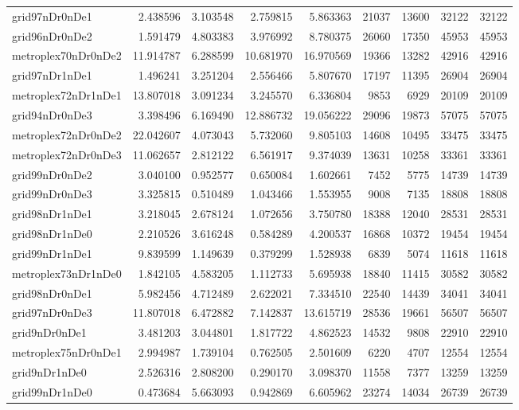 \begin{longtable}{|l|r|r|r|r|r|r|r|r|}
grid97nDr0nDe1 & 2.438596 & 3.103548 & 2.759815 & 5.863363 & 21037 & 13600 & 32122 & 32122 \\
grid96nDr0nDe2 & 1.591479 & 4.803383 & 3.976992 & 8.780375 & 26060 & 17350 & 45953 & 45953 \\
metroplex70nDr0nDe2 & 11.914787 & 6.288599 & 10.681970 & 16.970569 & 19366 & 13282 & 42916 & 42916 \\
grid97nDr1nDe1 & 1.496241 & 3.251204 & 2.556466 & 5.807670 & 17197 & 11395 & 26904 & 26904 \\
metroplex72nDr1nDe1 & 13.807018 & 3.091234 & 3.245570 & 6.336804 & 9853 & 6929 & 20109 & 20109 \\
grid94nDr0nDe3 & 3.398496 & 6.169490 & 12.886732 & 19.056222 & 29096 & 19873 & 57075 & 57075 \\
metroplex72nDr0nDe2 & 22.042607 & 4.073043 & 5.732060 & 9.805103 & 14608 & 10495 & 33475 & 33475 \\
metroplex72nDr0nDe3 & 11.062657 & 2.812122 & 6.561917 & 9.374039 & 13631 & 10258 & 33361 & 33361 \\
grid99nDr0nDe2 & 3.040100 & 0.952577 & 0.650084 & 1.602661 & 7452 & 5775 & 14739 & 14739 \\
grid99nDr0nDe3 & 3.325815 & 0.510489 & 1.043466 & 1.553955 & 9008 & 7135 & 18808 & 18808 \\
grid98nDr1nDe1 & 3.218045 & 2.678124 & 1.072656 & 3.750780 & 18388 & 12040 & 28531 & 28531 \\
grid98nDr1nDe0 & 2.210526 & 3.616248 & 0.584289 & 4.200537 & 16868 & 10372 & 19454 & 19454 \\
grid99nDr1nDe1 & 9.839599 & 1.149639 & 0.379299 & 1.528938 & 6839 & 5074 & 11618 & 11618 \\
metroplex73nDr1nDe0 & 1.842105 & 4.583205 & 1.112733 & 5.695938 & 18840 & 11415 & 30582 & 30582 \\
grid98nDr0nDe1 & 5.982456 & 4.712489 & 2.622021 & 7.334510 & 22540 & 14439 & 34041 & 34041 \\
grid97nDr0nDe3 & 11.807018 & 6.472882 & 7.142837 & 13.615719 & 28536 & 19661 & 56507 & 56507 \\
grid9nDr0nDe1 & 3.481203 & 3.044801 & 1.817722 & 4.862523 & 14532 & 9808 & 22910 & 22910 \\
metroplex75nDr0nDe1 & 2.994987 & 1.739104 & 0.762505 & 2.501609 & 6220 & 4707 & 12554 & 12554 \\
grid9nDr1nDe0 & 2.526316 & 2.808200 & 0.290170 & 3.098370 & 11558 & 7377 & 13259 & 13259 \\
grid99nDr1nDe0 & 0.473684 & 5.663093 & 0.942869 & 6.605962 & 23274 & 14034 & 26739 & 26739 \\

\end{longtable}
